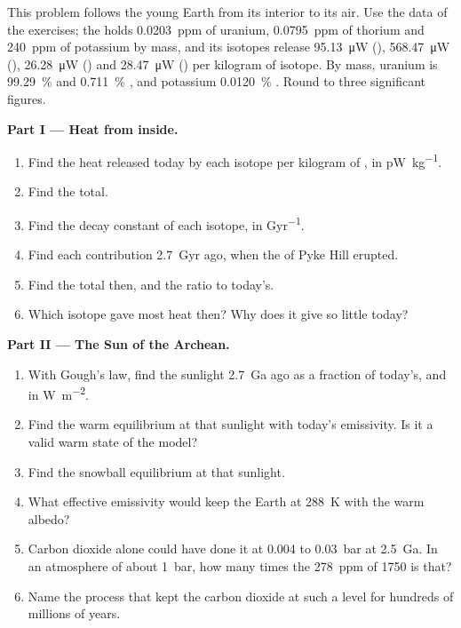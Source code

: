 \begin{problem}\label{pb:b2:precambrian-earth:1}
This problem follows the young Earth from its interior to its air. Use the data of the
exercises; the  holds \qty{0.0203}{ppm} of uranium, \qty{0.0795}{ppm} of
thorium and \qty{240}{ppm} of potassium by mass, and its isotopes release \qty{95.13}{\micro W}
(), \qty{568.47}{\micro W} (), \qty{26.28}{\micro W} () and
\qty{28.47}{\micro W} () per kilogram of isotope. By mass, uranium is
\qty{99.29}{\percent}  and \qty{0.711}{\percent} , and potassium
\qty{0.0120}{\percent} . Round to three significant figures.

\noindent\textbf{Part I --- Heat from inside.}
\begin{enumerate}
  \item Find the heat released today by each isotope per kilogram of , in
        \unit{pW.kg^{-1}}.
  \item Find the total.
  \item Find the decay constant of each isotope, in \unit{Gyr^{-1}}.
  \item Find each contribution \qty{2.7}{Gyr} ago, when the  of Pyke Hill erupted.
  \item Find the total then, and the ratio to today's.
  \item Which isotope gave most heat then? Why does it give so little today?
\end{enumerate}

\noindent\textbf{Part II --- The Sun of the Archean.}
\begin{enumerate}[resume]
  \item With Gough's law, find the sunlight \qty{2.7}{Ga} ago as a fraction of today's, and in
        \unit{W.m^{-2}}.
  \item Find the warm equilibrium at that sunlight with today's emissivity. Is it a valid warm
        state of the model?
  \item Find the snowball equilibrium at that sunlight.
  \item What effective emissivity would keep the Earth at \qty{288}{K} with the warm albedo?
  \item Carbon dioxide alone could have done it at 0.004 to \qty{0.03}{bar} at \qty{2.5}{Ga}.
        In an atmosphere of about \qty{1}{bar}, how many times the \qty{278}{ppm} of 1750 is
        that?
  \item Name the process that kept the carbon dioxide at such a level for hundreds of millions
        of years.
\end{enumerate}


\end{problem}
